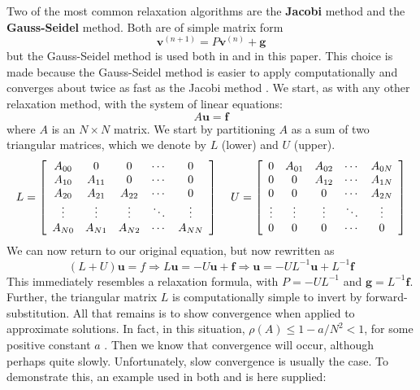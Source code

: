 Two of the most common relaxation algorithms are the \textbf{Jacobi} method and the \textbf{Gauss-Seidel} method. Both are of simple matrix form \[\textbf{v}^{(n+1)}=P\textbf{v}^{(n)}+\textbf{g}\] but the Gauss-Seidel method is used both in \cite{lee14} and in this paper. This choice is made because the Gauss-Seidel method is easier to apply computationally \cite{briggs87} and converges about twice as fast as the Jacobi method \cite{lee14}. We start, as with any other relaxation method, with the system of linear equations:
\[A\textbf{u}=\textbf{f}\]
where $A$ is an $N\times N$ matrix. We start by partitioning $A$ as a sum of two triangular matrices, which we denote by $L$ (lower) and $U$ (upper).
\[L=
\left[\begin{array}{ccccc}
A_{00} & 0 & 0 & \cdots & 0 \\
A_{10} & A_{11} & 0 & \cdots & 0 \\
A_{20} & A_{21} & A_{22} & \cdots & 0 \\
\vdots & \vdots & \vdots & \ddots & \vdots \\
A_{N0} & A_{N1} & A_{N2} & \cdots & A_{NN}
\end{array}\right]
\hspace{.15in}
U=
\left[\begin{array}{ccccc}
0 & A_{01} & A_{02} & \cdots & A_{0N} \\
0 & 0 & A_{12} & \cdots & A_{1N} \\
0 & 0 & 0 & \cdots & A_{2N} \\
\vdots & \vdots & \vdots & \ddots & \vdots \\
0 & 0 & 0 & \cdots & 0
\end{array}\right]\]
We can now return to our original equation, but now rewritten as
\[(L+U)\textbf{u}=f\Rightarrow
L\textbf{u}=-U\textbf{u}+\textbf{f}\Rightarrow
\textbf{u}=-UL^{-1}\textbf{u}+L^{-1}\textbf{f}\]
This immediately resembles a relaxation formula, with $P=-UL^{-1}$ and $\textbf{g}=L^{-1}\textbf{f}$. Further, the triangular matrix $L$ is computationally simple to invert by forward-substitution. All that remains is to show convergence when applied to approximate solutions. In fact, in this situation, $\rho(A)\leq 1-a/N^2<1$, for some positive constant $a$ \cite{lee14}. Then we know that convergence will occur, although perhaps quite slowly. Unfortunately, slow convergence is usually the case. To demonstrate this, an example used in both \cite{lee14} and \cite{briggs87} is here supplied:
